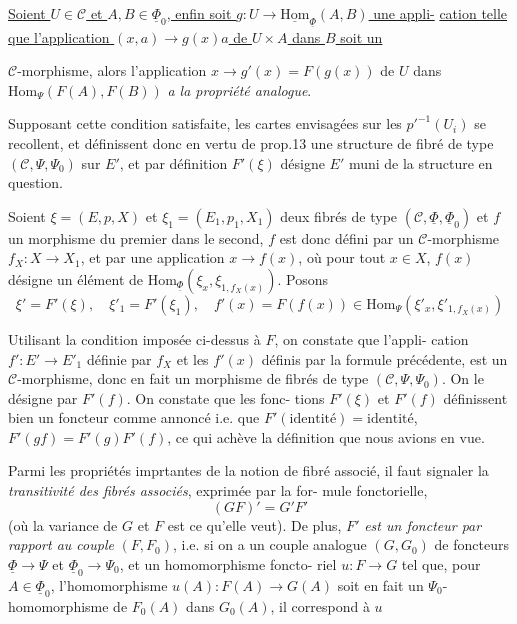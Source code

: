\underline{Soient $U \in \mathcal{C}$ et $A,B \in \underline{\Phi}_0$, enfin soit $g : U \to \underline{\mathrm{Hom}}_{\underline{\Phi}}(A,B)$ une appli-}
\underline{cation telle que l'application $(x,a) \to g(x)a$ de $U \times A$ dans $B$ soit un}

\newpage



$\mathcal{C}$-morphisme, alors l'application $x \longrightarrow g'(x) = F(g(x))$ de $U$ dans
$\mathrm{Hom}_{\Psi}(F(A),F(B))$ \emph{a la propriété analogue}.

Supposant cette condition satisfaite, les cartes envisagées sur les
${p'}^{-1}(U_i)$ se recollent, et définissent donc en vertu de prop.13 une
structure de fibré de type $(\mathcal{C}, \Psi, \Psi_0)$ sur $E'$, et par définition
$F'(\xi)$ désigne $E'$ muni de la structure en question.

Soient $\xi = (E,p,X)$ et $\xi_1 = (E_1,p_1,X_1)$ deux fibrés de type $(\mathcal{C}, \underline{\Phi}, \underline{\Phi}_0)$
et $f$ un morphisme du premier dans le second, $f$ est donc défini par un
$\mathcal{C}$-morphisme $f_X: X \to X_1$, et par une application $x \longrightarrow f(x)$, où pour
tout $x \in X$, $f(x)$ désigne un élément de $\mathrm{Hom}_{\underline{\Phi}}(\xi_x, \xi_{1,f_X(x)})$. Posons
$$\xi' = F'(\xi), \quad \xi'_1 = F'(\xi_1), \quad f'(x)=F(f(x)) \in \mathrm{Hom}_{\Psi}(\xi'_x, \xi'_{1,f_X(x)})$$

Utilisant la condition imposée ci-dessus à $F$, on constate que l'appli-
cation $f': E' \longrightarrow E'_1$ définie par $f_X$ et les $f'(x)$ définis par la formule
précédente, est un $\mathcal{C}$-morphisme, donc en fait un morphisme de fibrés de
type $(\mathcal{C}, \Psi, \Psi_0)$. On le désigne par $F'(f)$. On constate que les fonc-
tions $F'(\xi)$ et $F'(f)$ définissent bien un foncteur comme annoncé i.e.
que $F'(\text{identité})=\text{identité}$, $F'(gf)=F'(g)F'(f)$, ce qui achève la définition
que nous avions en vue.

Parmi les propriétés imprtantes de la notion de fibré associé, il
faut signaler la \emph{transitivité des fibrés associés}, exprimée par la for-
mule fonctorielle,
$$(GF)' = G'F'$$
(où la variance de $G$ et $F$ est ce qu'elle veut). De plus, $F'$ \emph{est un
foncteur par rapport au couple} $(F,F_0)$, i.e. si on a un couple analogue
$(G,G_0)$ de foncteurs $\underline{\Phi} \to \Psi$ et $\underline{\Phi}_0 \to \Psi_0$, et un homomorphisme foncto-
riel $u: F \to G$ tel que, pour $A \in \underline{\Phi}_0$, l'homomorphisme $u(A): F(A) \to G(A)$ soit
en fait un $\Psi_0$-homomorphisme de $F_0(A)$ dans $G_0(A)$, il correspond à $u$

